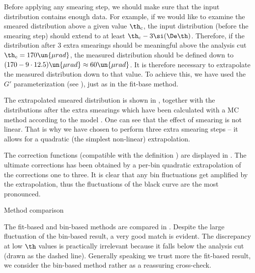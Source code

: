 Before applying any smearing step, we should make sure that the input distribution contains enough data. For example, if we would like to examine the smeared distribution above a given value $\th_{\rm c}$, the input distribution (before the smearing step) should extend to at least $\th_{\rm c} -3\si(\De\th)$. Therefore, if the distribution after 3 extra smearings should be meaningful above the analysis cut $\th_c = 170\un{\mu rad}$, the measured distribution should be defined down to $(170 - 9\cdot 12.5) \un{\mu rad}\approx 60 \un{\mu rad}$. It is therefore necessary to extrapolate the measured distribution down to that value. To achieve this, we have used the $G'$ parameterization (see ), just as in the fit-base method.

The extrapolated smeared distribution is shown in , together with the distributions after the extra smearings which have been calculated with a MC method according to the model . One can see that the effect of smearing is not linear. That is why we have chosen to perform three extra smearing steps -- it allows for a quadratic (the simplest non-linear) extrapolation.

The correction functions (compatible with the definition ) are displayed in . The ultimate corrections has been obtained by a per-bin quadratic extrapolation of the corrections one to three. It is clear that any bin fluctuations get amplified by the extrapolation, thus the fluctuations of the black curve are the most pronounced.

\bmfig
{}
\emfig

\caption{Method comparison}

The fit-based and bin-based methods are compared in . Despite the large fluctuation of the bin-based result, a very good match is evident. The discrepancy at low $\th$ values is practically irrelevant because it falls below the analysis cut (drawn as the dashed line). Generally speaking we trust more the fit-based result, we consider the bin-based method rather as a reassuring cross-check.

